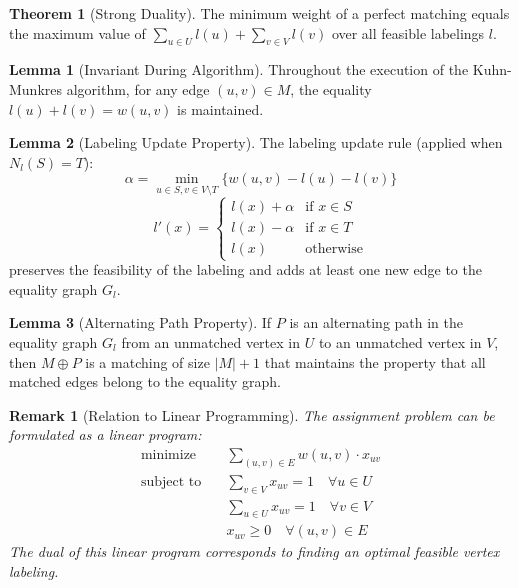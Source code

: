 \documentclass{article}
\newtheorem{remark}{Remark}
\theoremstyle{definition}
\newtheorem{theorem}{Theorem}
\newtheorem{lemma}{Lemma}
\begin{document}
\begin{theorem}[Strong Duality]
The minimum weight of a perfect matching equals the maximum value of $\sum_{u \in U} l(u) + \sum_{v \in V} l(v)$ over all feasible labelings $l$.
\end{theorem}
\begin{lemma}[Invariant During Algorithm]
Throughout the execution of the Kuhn-Munkres algorithm, for any edge $(u,v) \in M$, the equality $l(u) + l(v) = w(u,v)$ is maintained.
\end{lemma}
\begin{lemma}[Labeling Update Property]
The labeling update rule (applied when $N_l(S) = T$):
\begin{equation}
\alpha = \min_{u \in S, v \in V \setminus T} \{w(u,v) - l(u) - l(v)\}
\end{equation}
\begin{equation}
l'(x) = \begin{cases}
l(x) + \alpha & \text{if } x \in S\\
l(x) - \alpha & \text{if } x \in T\\
l(x) & \text{otherwise}
\end{cases}
\end{equation}
preserves the feasibility of the labeling and adds at least one new edge to the equality graph $G_l$.
\end{lemma}

\begin{lemma}[Alternating Path Property]
If $P$ is an alternating path in the equality graph $G_l$ from an unmatched vertex in $U$ to an unmatched vertex in $V$, then $M \oplus P$ is a matching of size $|M|+1$ that maintains the property that all matched edges belong to the equality graph.
\end{lemma}

\begin{remark}[Relation to Linear Programming]
The assignment problem can be formulated as a linear program:
\begin{align}
\text{minimize} \quad & \sum_{(u,v) \in E} w(u,v) \cdot x_{uv}\\
\text{subject to} \quad & \sum_{v \in V} x_{uv} = 1 \quad \forall u \in U\\
& \sum_{u \in U} x_{uv} = 1 \quad \forall v \in V\\
& x_{uv} \geq 0 \quad \forall (u,v) \in E
\end{align}
The dual of this linear program corresponds to finding an optimal feasible vertex labeling.
\end{remark}
\end{document}
